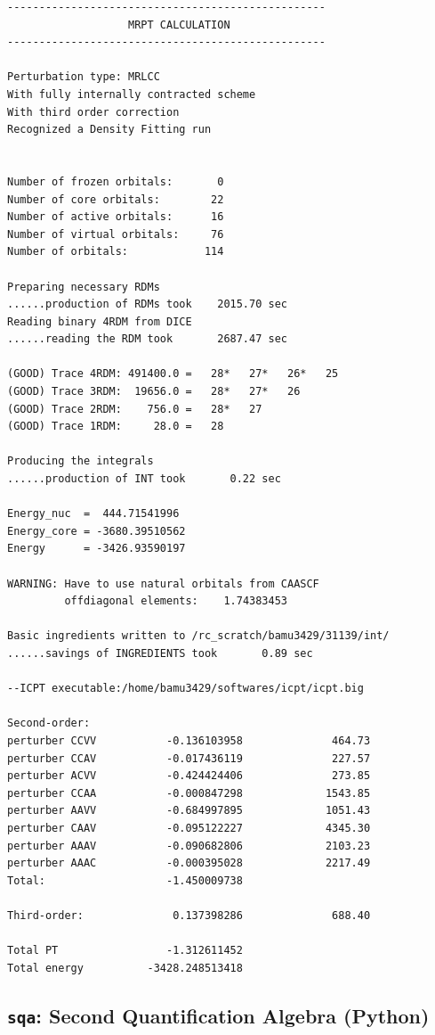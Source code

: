 \documentclass{article}
\newcommand  \var[1]       {\texttt{#1}}
\begin{document}
\begin{Verbatim}[framesep=3mm,frame=single,framerule=2pt,rulecolor=\color{gray},numberblanklines=false]
--------------------------------------------------
                   MRPT CALCULATION
--------------------------------------------------

Perturbation type: MRLCC
With fully internally contracted scheme
With third order correction
Recognized a Density Fitting run


Number of frozen orbitals:       0
Number of core orbitals:        22
Number of active orbitals:      16
Number of virtual orbitals:     76
Number of orbitals:            114

Preparing necessary RDMs
......production of RDMs took    2015.70 sec
Reading binary 4RDM from DICE
......reading the RDM took       2687.47 sec

(GOOD) Trace 4RDM: 491400.0 =   28*   27*   26*   25
(GOOD) Trace 3RDM:  19656.0 =   28*   27*   26
(GOOD) Trace 2RDM:    756.0 =   28*   27
(GOOD) Trace 1RDM:     28.0 =   28

Producing the integrals
......production of INT took       0.22 sec

Energy_nuc  =  444.71541996
Energy_core = -3680.39510562
Energy      = -3426.93590197

WARNING: Have to use natural orbitals from CAASCF
         offdiagonal elements:    1.74383453

Basic ingredients written to /rc_scratch/bamu3429/31139/int/
......savings of INGREDIENTS took       0.89 sec

--ICPT executable:/home/bamu3429/softwares/icpt/icpt.big

Second-order:
perturber CCVV           -0.136103958              464.73
perturber CCAV           -0.017436119              227.57
perturber ACVV           -0.424424406              273.85
perturber CCAA           -0.000847298             1543.85
perturber AAVV           -0.684997895             1051.43
perturber CAAV           -0.095122227             4345.30
perturber AAAV           -0.090682806             2103.23
perturber AAAC           -0.000395028             2217.49
Total:                   -1.450009738

Third-order:              0.137398286              688.40

Total PT                 -1.312611452
Total energy          -3428.248513418
\end{Verbatim}

\subsection{\var{sqa}: Second Quantification Algebra (Python)}
\end{document}

